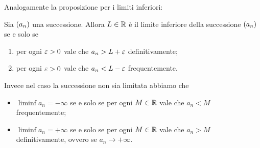 Analogamente la proposizione per i limiti inferiori:
\begin{proposition}
    \label{prop:caratt_3_liminf}
    Sia $\seqn*{a}$ una successione. Allora $L \in \mathbb{R}$ è il limite inferiore della successione $\seqn*{a}$ se e solo se
    \begin{enumerate}[label={(\roman*)}]
        \item per ogni $\varepsilon > 0$ vale che $a_n > L + \varepsilon$ definitivamente;
        \item per ogni $\varepsilon > 0$ vale che $a_n < L - \varepsilon$ frequentemente.
    \end{enumerate}

    Invece nel caso la successione non sia limitata abbiamo che \begin{itemize}
        \item $\liminf a_n = -\infty$ se e solo se per ogni $M \in \mathbb{R}$ vale che $a_n < M$ frequentemente;
        \item $\liminf a_n = +\infty$ se e solo se per ogni $M \in \mathbb{R}$ vale che $a_n > M$ definitivamente, ovvero se $a_n \to +\infty$.
    \end{itemize}
\end{proposition}

